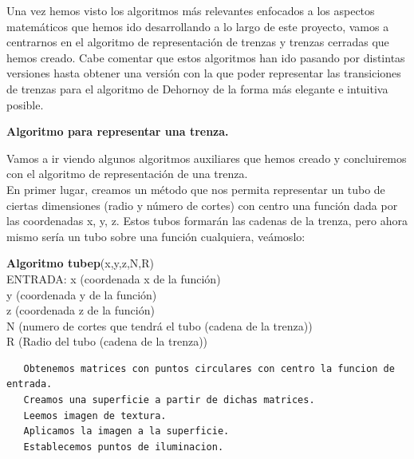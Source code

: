 \newpage

Una vez hemos visto los algoritmos más relevantes enfocados a los aspectos matemáticos que hemos ido desarrollando a lo largo de este proyecto, vamos a centrarnos en el algoritmo de representación de trenzas y trenzas cerradas que hemos creado. Cabe comentar que estos algoritmos han ido pasando por distintas versiones hasta obtener una versión con la que poder representar las transiciones de trenzas para el algoritmo de Dehornoy de la forma más elegante e intuitiva posible. 

 \begin{center}
 	\textbf{Algoritmo para representar una trenza.}
 \end{center} 
 Vamos a ir viendo algunos algoritmos auxiliares que hemos creado y concluiremos con el algoritmo de representación de una trenza. \\
 En primer lugar, creamos un método que nos permita representar un tubo de ciertas dimensiones (radio y número de cortes) con centro una función dada por las coordenadas x, y, z. Estos tubos formarán las cadenas de la trenza, pero ahora mismo sería un tubo sobre una función cualquiera, veámoslo:
 
 \begin{alg}
 	\textbf{Algoritmo tubep}(x,y,z,N,R)\\
 	ENTRADA: x (coordenada x de la función)\\
 	\hspace*{2.2cm} y (coordenada y de la función)\\
 	\hspace*{2.2cm} z (coordenada z de la función)\\
 	\hspace*{2.2cm} N (numero de cortes que tendrá el tubo (cadena de la trenza))\\
 	\hspace*{2.2cm} R (Radio del tubo (cadena de la trenza))
 	
\begin{lstlisting}
   Obtenemos matrices con puntos circulares con centro la funcion de entrada.
   Creamos una superficie a partir de dichas matrices.
   Leemos imagen de textura.
   Aplicamos la imagen a la superficie.
   Establecemos puntos de iluminacion.
   
\end{lstlisting}
 \end{alg}
 

